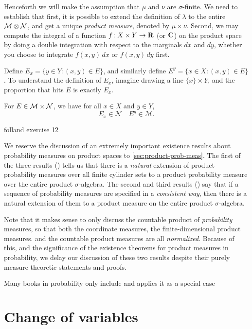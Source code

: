 Henceforth we will make the assumption that $\mu$ and $\nu$ are $\sigma$-finite. We need to establish that first, it is possible to extend the definition of $\lambda$ to the entire $\mathcal{M} \otimes \mathcal N$, and get a unique \emph{product measure}, denoted by $\mu \times \nu$. Second, we may compute the integral of a function $f\colon X\times Y\to \mathbf{R}$ (or $\mathbf{C}$) on the product space by doing a double integration with respect to the marginals $dx$ and $dy$, whether you choose to integrate $f(x,y)\,dx$ or $f(x,y)\,dy$ first. 

Define $E_x = \{y \in Y : (x,y)\in E\}$, and similarly define $E^y = \{x \in X : (x,y)\in E\}$. To understand the definition of $E_x$, imagine drawing a line $\{x\}\times Y$, and the proportion that hits $E$ is exactly $E_x$.

For $E \in \mathcal{M} \times \mathcal N$, we have for all $x \in X$ and $y \in Y$, \[
    E_x \in \mathcal N \quad E^y \in \mathcal M.
\] 

folland exercise 12




We reserve the discussion of an extremely important existence results about probability measures on product spaces to \cref{sec:product-prob-meas}. The first of the three results () tells us that there is a \emph{natural} extension of product probability measures over all finite cylinder sets to a product probability measure over the entire product $\sigma$-algebra.
The second and third results () say that if a sequence of probability measures are specified in a \emph{consistent way}, then there is a natural extension of them to a product measure on the entire product $\sigma$-algebra. 

Note that it makes sense to only discuss the countable product of \emph{probability} measures, so that both the coordinate measures, the finite-dimensional product measures. and the countable product measures are all \emph{normalized}. Because of this, and the significance of the existence theorems for product measures in probability, we delay our discussion of these two results despite their purely measure-theoretic statements and proofs.

Many books in probability only include and applies it as a special case

\begin{namedthm} \label{thm:Fubini-Tonelli}
    
\end{namedthm}

\section{Change of variables} \label{sec:cov}

